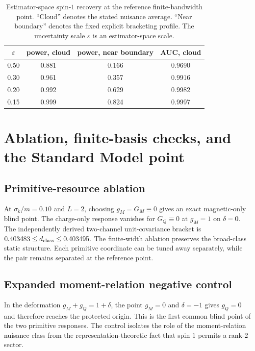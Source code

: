 \documentclass[12pt]{iopjournal}
\newenvironment{ruledtabular}{\centering}{}
\newcommand{\colrule}{\hline}
\begin{document}
\begin{table}[h]
\caption{Estimator-space spin-$1$ recovery at the reference finite-bandwidth point. ``Cloud'' denotes the stated nuisance average. ``Near boundary'' denotes the fixed explicit bracketing profile. The uncertainty scale $\varepsilon$ is an estimator-space scale.}
\label{tab:power}
\begin{ruledtabular}
\begin{tabular}{cccc}
$\varepsilon$ & power, cloud & power, near boundary & AUC, cloud\\
\colrule
0.50 & 0.881 & 0.166 & 0.9690\\
0.30 & 0.961 & 0.357 & 0.9916\\
0.20 & 0.992 & 0.629 & 0.9982\\
0.15 & 0.999 & 0.824 & 0.9997\\
\end{tabular}
\end{ruledtabular}
\end{table}


\section{Ablation, finite-basis checks, and the Standard Model point}

\subsection{Primitive-resource ablation}
At $\sigma_k/m=0.10$ and $L=2$, choosing $g_M=G_M\equiv0$ gives an exact magnetic-only blind point. The charge-only response vanishes for $G_Q\equiv0$ at $g_M=1$ on $\delta=0$. The independently derived two-channel unit-covariance bracket is $0.403483\le d_{\rm class}\le0.403495$. The finite-width ablation preserves the broad-class static structure. Each primitive coordinate can be tuned away separately, while the pair remains separated at the reference point.

\subsection{Expanded moment-relation negative control}
In the deformation $g_M+g_Q=1+\delta$, the point $g_M=0$ and $\delta=-1$ gives $g_Q=0$ and therefore reaches the protected origin. This is the first common blind point of the two primitive responses. The control isolates the role of the moment-relation nuisance class from the representation-theoretic fact that spin $1$ permits a rank-$2$ sector.
\end{document}
